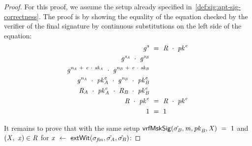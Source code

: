 \begin{proof}
    \label{prf:apt-schnorr-pre-sig-corr}
    For this proof, we assume the setup already specified in~\cref{def:sig:apt-sig-correctness}.
    The proof is by showing the equality of the equation checked by the verifier of the final signature by continuous substitutions on the left side of the equation:
    \begin{align}
        \mathit{g}^{\mathit{s}} &~=~ \mathit{R} ~\cdot~ \mathit{pk}^{\mathit{e}} \\
        \mathit{g}^{\mathit{s}_{\mathit{A}}} ~\cdot~ \mathit{g}^{\mathit{s}_{\mathit{B}}} & \\
        \mathit{g}^{\mathit{\mathit{n}_{\mathit{A}}} ~+~ \mathit{e} ~\cdot~ \mathit{sk}_{\mathit{A}}} ~\cdot~ \mathit{g}^{\mathit{\mathit{n}_{\mathit{B}}} ~+~ \mathit{e} ~\cdot~ \mathit{sk}_{\mathit{B}}} & \\
        \mathit{g}^{\mathit{\mathit{n}_{\mathit{A}}}} ~\cdot~ \mathit{pk}_{\mathit{A}}^{\mathit{e}} ~\cdot~ \mathit{g}^{\mathit{\mathit{n}_{\mathit{B}}}} ~\cdot~ \mathit{pk}_{\mathit{B}}^{\mathit{e}} & \\
        \mathit{R}_{\mathit{A}} ~\cdot~ \mathit{pk}_{\mathit{A}}^{\mathit{e}} ~\cdot~ \mathit{R}_{\mathit{B}} ~\cdot~ \mathit{pk}_{\mathit{B}}^{\mathit{e}} & \\
        \mathit{R} ~\cdot~ \mathit{pk}^{\mathit{e}} & ~=~ \mathit{R} ~\cdot~ \mathit{pk}^{\mathit{e}} \\
        1 & ~=~ 1
    \end{align}

    It remains to prove that with the same setup $\mathsf{vrfMskSig}(\hat{\sigma_{\mathit{B}}},\mathit{m},\mathit{pk}_{\mathit{B}},\mathit{X}) ~=~ 1$ and
    $(\mathit{X} ,~ \mathit{x}) \in \mathit{R}$ for $\mathit{x} ~\leftarrow~ \mathsf{extWit}(\sigma_{\mathit{fin}}, \tilde{\sigma_{\mathit{A}}}, \hat{\sigma_{\mathit{B}}})$:


\end{proof}
